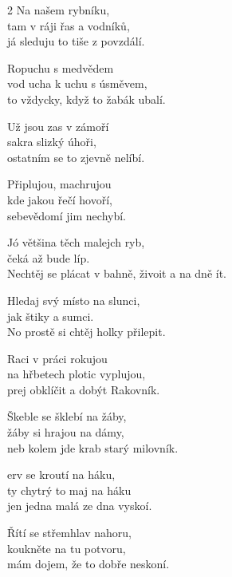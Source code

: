 
\begin{multicols}{2}
\ve{}
Na našem rybníku,\\
tam v ráji řas a vodníků,\\
já sleduju to tiše z povzdálí.

Ropuchu s medvědem\\
vod ucha k uchu s úsměvem,\\
to vždycky, když to žabák ubalí.

\vfill
\columnbreak
\vspace*{\fill}
\ve{}
Už jsou zas v zámoří\\
sakra slizký úhoři,\\
ostatním se to zjevně nelíbí.

Připlujou, machrujou\\
kde jakou řečí hovoří,\\
sebevědomí jim nechybí.
\end{multicols}

\cho{}
Jó většina těch malejch ryb,\\
čeká až bude líp.\\
Nechtěj se plácat v bahně, živoit a na dně ít.

Hledaj svý místo na slunci,\\
jak štiky a sumci.\\
No prostě si chtěj holky přilepit.

\ve{}
Raci v práci rokujou\\
na hřbetech plotic vyplujou,\\
prej obklíčit a dobýt Rakovník.

Škeble se šklebí na žáby,\\
žáby si hrajou na dámy,\\
neb kolem jde krab starý milovník.

\cho{}

\ve{}
erv se kroutí na háku,\\
ty chytrý to maj na háku\\
jen jedna malá ze dna vyskoí.

Řítí se střemhlav nahoru,\\
koukněte na tu potvoru,\\
mám dojem, že to dobře neskoní.

\cho{}

\esong{}